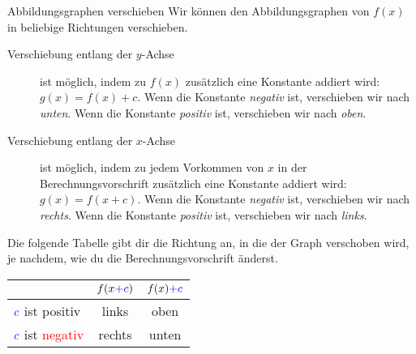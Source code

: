 \documentclass[../../main.tex]{subfiles}
\begin{document}
\begin{nutshell}{Abbildungsgraphen verschieben}
    Wir können den Abbildungsgraphen von $f(x)$ in beliebige Richtungen verschieben.
    \begin{description}
        \item[Verschiebung entlang der $y$-Achse] ist möglich, indem zu $f(x)$ zusätzlich eine Konstante addiert wird: $g(x) = f(x)+c$. Wenn die Konstante \emph{negativ} ist, verschieben wir nach \emph{unten}. Wenn die Konstante \emph{positiv} ist, verschieben wir nach \emph{oben}.
        \item[Verschiebung entlang der $x$-Achse] ist möglich, indem zu jedem Vorkommen von $x$ in der Berechnungsvorschrift zusätzlich eine Konstante addiert wird: $g(x) = f(x+c)$. Wenn die Konstante \emph{negativ} ist, verschieben wir nach \emph{rechts}. Wenn die Konstante \emph{positiv} ist, verschieben wir nach \emph{links}.
    \end{description}
    Die folgende Tabelle gibt dir die Richtung an, in die der Graph verschoben wird, je nachdem, wie du die Berechnungsvorschrift änderst.
    \begin{center}
        \begin{tabular}{l||cc}
             & $f(x\textcolor{blue}{+c})$ & $f(x)\textcolor{blue}{ + c}$\\\hline\hline
            $\color{blue} c$ ist \textcolor{green!50!black}{positiv} & links & oben\\
            $\color{blue} c$ ist \textcolor{red}{negativ} & rechts & unten\\
        \end{tabular}
    \end{center}
\end{nutshell}
\end{document}
